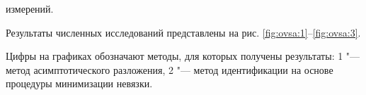измерений. 

Результаты численных исследований представлены на рис. \ref{fig:ovsa:1}--\ref{fig:ovsa:3}. 

Цифры на графиках обозначают методы, для которых получены результаты: 1 "--- метод асимптотического разложения, 2 "--- метод идентификации на основе процедуры минимизации невязки.


























